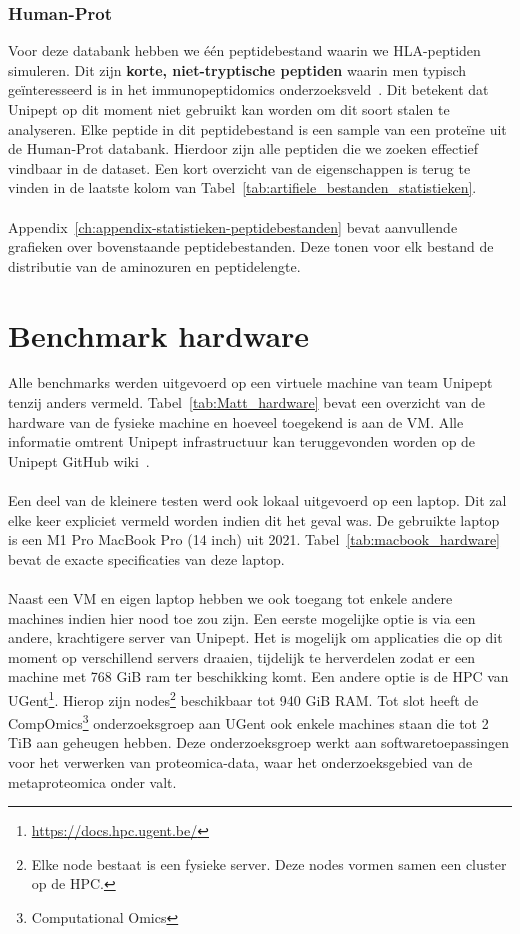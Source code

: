 \subsubsection{Human-Prot}
Voor deze databank hebben we één peptidebestand waarin we HLA-peptiden simuleren.
Dit zijn \textbf{korte, niet-tryptische peptiden} waarin men typisch geïnteresseerd is in het immunopeptidomics onderzoeksveld~\cite{immunopeptidomics}.
Dit betekent dat Unipept op dit moment niet gebruikt kan worden om dit soort stalen te analyseren.
Elke peptide in dit peptidebestand is een sample van een proteïne uit de Human-Prot databank.
Hierdoor zijn alle peptiden die we zoeken effectief vindbaar in de dataset.
Een kort overzicht van de eigenschappen is terug te vinden in de laatste kolom van Tabel~\ref{tab:artifiele_bestanden_statistieken}.
\\ \\
Appendix~\ref{ch:appendix-statistieken-peptidebestanden} bevat aanvullende grafieken over bovenstaande peptidebestanden.
Deze tonen voor elk bestand de distributie van de aminozuren en peptidelengte.


\section{Benchmark hardware}\label{sec:benchmark-hardware}
Alle benchmarks werden uitgevoerd op een virtuele machine van team Unipept tenzij anders vermeld.
Tabel~\ref{tab:Matt_hardware} bevat een overzicht van de hardware van de fysieke machine en hoeveel toegekend is aan de VM\@.
Alle informatie omtrent Unipept infrastructuur kan teruggevonden worden op de Unipept GitHub wiki~\cite{unipept_infrastructure}.
\\ \\
Een deel van de kleinere testen werd ook lokaal uitgevoerd op een laptop.
Dit zal elke keer expliciet vermeld worden indien dit het geval was.
De gebruikte laptop is een M1 Pro MacBook Pro (14 inch) uit 2021.
Tabel~\ref{tab:macbook_hardware} bevat de exacte specificaties van deze laptop.
\\ \\
Naast een VM en eigen laptop hebben we ook toegang tot enkele andere machines indien hier nood toe zou zijn.
Een eerste mogelijke optie is via een andere, krachtigere server van Unipept.
Het is mogelijk om applicaties die op dit moment op verschillend servers draaien, tijdelijk te herverdelen zodat er een machine met 768 GiB ram ter beschikking komt.
Een andere optie is de HPC van UGent\footnote{\url{https://docs.hpc.ugent.be/}}.
Hierop zijn nodes\footnote{Elke node bestaat is een fysieke server. Deze nodes vormen samen een cluster op de HPC.} beschikbaar tot 940 GiB RAM\@.
Tot slot heeft de CompOmics\footnote{Computational Omics} onderzoeksgroep aan UGent ook enkele machines staan die tot 2 TiB aan geheugen hebben.
Deze onderzoeksgroep werkt aan softwaretoepassingen voor het verwerken van proteomica-data, waar het onderzoeksgebied van de metaproteomica onder valt.

